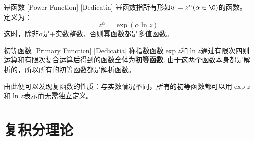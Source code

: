 \documentclass[UTF8]{ctexart}
\newcommand{\AnalyticalFunction}{\hyperref[dfn:AnalyticalFunction]{解析函数}}
\begin{document}
\begin{dfn}
    [UUID]
    {幂函数}
    [Power Function]
    [Dedicatia]
    幂函数指所有形如$w=z^\alpha (\alpha\in\C)$的函数。定义为：
    \[z^\alpha = \exp(\alpha \ln z)\]
    这时，除非$\alpha$是+实数整数，否则幂函数都是多值函数。
\end{dfn}
\begin{dfn}
    [UUID]
    {初等函数}
    [Primary Function]
    [Dedicatia]
    称指数函数$\exp z$和$\ln z$通过有限次四则运算和有限次复合运算后得到的函数全体为\textbf{初等函数}. 由于这两个函数本身都是解析的，所以所有的初等函数都是\AnalyticalFunction 。
\end{dfn}
由此便可以发现复函数的性质：与实数情况不同，所有的初等函数都可以用$\exp z$和$\ln z$表示而无需独立定义。
\section{复积分理论}
\end{document}
